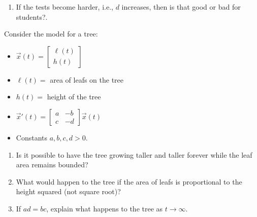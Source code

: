 \begin{exercises}
\begin{problist}
\begin{enumerate}
		\item If the tests become harder, i.e., $d$ increases, then is that good or bad for students?.
	\end{enumerate}
	
	\prob Consider the model for a tree:
	\begin{itemize}
		\item $\vec{x}(t) = \begin{bmatrix} \ell(t) \\ h(t) \end{bmatrix}$
		\item $\ell(t)=$ area of leafs on the tree
		\item $h(t)=$ height of the tree
		\item $\vec{x}'(t) =
		\begin{bmatrix}
			a & -b \\
			c & -d 
		\end{bmatrix}
		\vec{x}(t)$
		\item Constants $a,b,c,d>0$.
	\end{itemize}
	\begin{enumerate}
		\item Is it possible to have the tree growing taller and taller forever while the leaf area remains bounded?
		\item What would happen to the tree if the area of leafs is proportional to the height squared (not square root)?
		\item If $ad=bc$, explain what happens to the tree as $t\to \infty$.
	\end{enumerate}
	

\end{problist}
\end{exercises}
